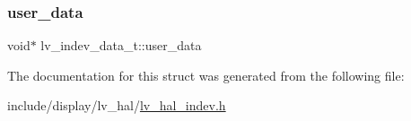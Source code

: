 \subsubsection{\texorpdfstring{user\_data}{user\_data}}
{\footnotesize\ttfamily void$\ast$ lv\+\_\+indev\+\_\+data\+\_\+t\+::user\+\_\+data}



The documentation for this struct was generated from the following file\+:\begin{DoxyCompactItemize}
\item 
include/display/lv\+\_\+hal/\mbox{\hyperlink{lv__hal__indev_8h}{lv\+\_\+hal\+\_\+indev.\+h}}\end{DoxyCompactItemize}
